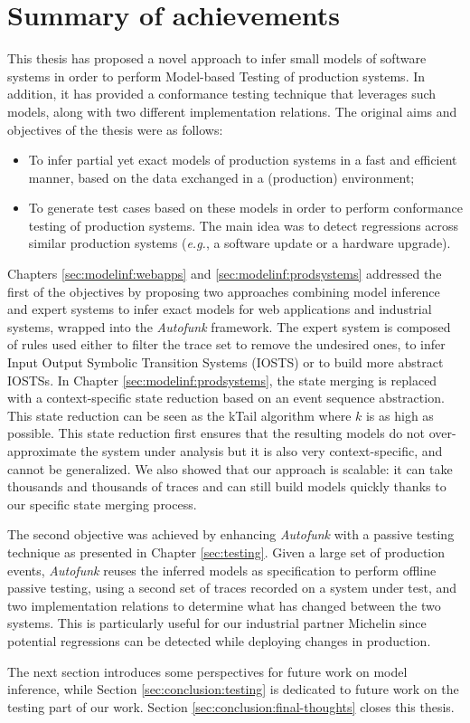 \section{Summary of achievements}

This thesis has proposed a novel approach to infer small models
of software systems in order to perform Model-based Testing of
production systems. In addition, it has provided a conformance
testing technique that leverages such models, along with two
different implementation relations. The original aims and
objectives of the thesis were as follows:

\begin{itemize}
    \item To infer partial yet exact models of production systems
        in a fast and efficient manner, based on the data
        exchanged in a (production) environment;

    \item To generate test cases based on these models in order
        to perform conformance testing of production systems. The
        main idea was to detect regressions across similar
        production systems (\emph{e.g.}, a software update or a hardware
        upgrade).
\end{itemize}

Chapters \ref{sec:modelinf:webapps} and
\ref{sec:modelinf:prodsystems} addressed the first of the
objectives by proposing two approaches combining model inference
and expert systems to infer exact models for web applications and
industrial systems, wrapped into the \textit{Autofunk} framework.
The expert system is composed of rules used either to filter the
trace set to remove the undesired ones, to infer Input Output
Symbolic Transition Systems (IOSTS) or to build more abstract
IOSTSs. In Chapter \ref{sec:modelinf:prodsystems}, the state
merging is replaced with a context-specific state reduction based
on an event sequence abstraction. This state reduction can be
seen as the kTail algorithm \cite{5009015} where $k$ is as high
as possible.  This state reduction first ensures that the
resulting models do not over-approximate the system under
analysis but it is also very context-specific, and cannot be
generalized. We also showed that our approach is scalable: it can
take thousands and thousands of traces and can still build models
quickly thanks to our specific state merging process.

The second objective was achieved by enhancing \textit{Autofunk}
with a passive testing technique as presented in Chapter
\ref{sec:testing}. Given a large set of production events,
\textit{Autofunk} reuses the inferred models as specification to
perform offline passive testing, using a second set of traces
recorded on a system under test, and two implementation relations
to determine what has changed between the two systems. This is
particularly useful for our industrial partner Michelin since
potential regressions can be detected while deploying changes in
production.

The next section introduces some perspectives for future work on
model inference, while Section \ref{sec:conclusion:testing} is
dedicated to future work on the testing part of our work. Section
\ref{sec:conclusion:final-thoughts} closes this thesis.
